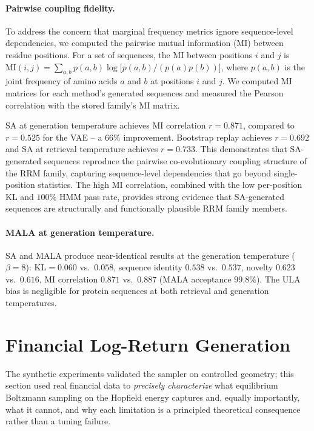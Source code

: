 \paragraph{Pairwise coupling fidelity.}
To address the concern that marginal frequency metrics ignore sequence-level dependencies, we computed the pairwise mutual information (MI) between residue positions. For a set of sequences, the MI between positions $i$ and $j$ is $\mathrm{MI}(i,j)=\sum_{a,b}p(a,b)\log\bigl[p(a,b)/(p(a)p(b))\bigr]$, where $p(a,b)$ is the joint frequency of amino acids $a$ and $b$ at positions $i$ and $j$. We computed MI matrices for each method's generated sequences and measured the Pearson correlation with the stored family's MI matrix.

SA at generation temperature achieves MI correlation $r{=}0.871$, compared to $r{=}0.525$ for the VAE -- a $66\%$ improvement. Bootstrap replay achieves $r{=}0.692$ and SA at retrieval temperature achieves $r{=}0.733$. This demonstrates that SA-generated sequences reproduce the pairwise co-evolutionary coupling structure of the RRM family, capturing sequence-level dependencies that go beyond single-position statistics. The high MI correlation, combined with the low per-position KL and $100\%$ HMM pass rate, provides strong evidence that SA-generated sequences are structurally and functionally plausible RRM family members.

\paragraph{MALA at generation temperature.}
SA and MALA produce near-identical results at the generation temperature ($\beta{=}8$): KL$=0.060$ vs.\ $0.058$, sequence identity $0.538$ vs.\ $0.537$, novelty $0.623$ vs.\ $0.616$, MI correlation $0.871$ vs.\ $0.887$ (MALA acceptance $99.8\%$). The ULA bias is negligible for protein sequences at both retrieval and generation temperatures.

\section{Financial Log-Return Generation}\label{app:finance}

The synthetic experiments validated the sampler on controlled geometry; this section used real financial data to \emph{precisely characterize} what equilibrium Boltzmann sampling on the Hopfield energy captures and, equally importantly, what it cannot, and why each limitation is a principled theoretical consequence rather than a tuning failure.

